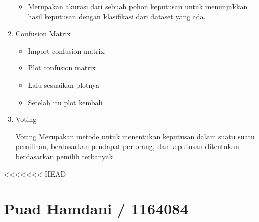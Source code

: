 \begin{enumerate}
\begin{itemize}
\item Merupakan akurasi dari sebuah pohon keputusan untuk menunjukkan hasil keputusan dengan klasifikasi dari dataset yang ada.
\end{itemize}
\item Confusion Matrix
\begin{itemize}
\item Import confusion matrix
\item Plot confusion matrix
\item Lalu sesuaikan plotnya
\item Setelah itu plot kembali
\end{itemize}
\item Voting
\par
Voting Merupakan metode untuk menentukan keputusan dalam suatu suatu pemilihan, berdasarkan pendapat per orang, dan keputusan ditentukan berdasarkan pemilih terbanyak
\end{enumerate}
<<<<<<< HEAD

\section {Puad Hamdani / 1164084}
